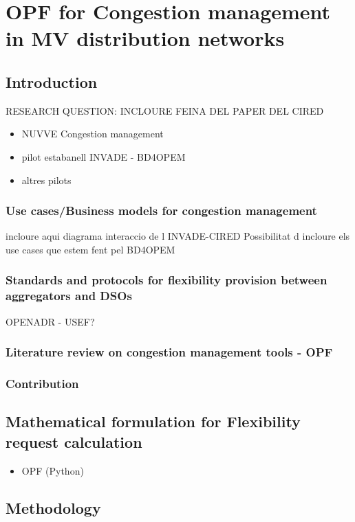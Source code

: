 \chapter{OPF for Congestion management in MV distribution networks}
\label{ChapterOPFDSO}

\section{Introduction}
RESEARCH QUESTION: INCLOURE FEINA DEL PAPER DEL CIRED
\begin{itemize}
\item NUVVE Congestion management
\item pilot estabanell INVADE - BD4OPEM 
\item altres pilots
\end{itemize}

\subsection{Use cases/Business models for congestion management}
incloure aqui diagrama interaccio de l INVADE-CIRED
Possibilitat d incloure els use cases que estem fent pel BD4OPEM 

\subsection{Standards and protocols for flexibility provision between aggregators and DSOs}
OPENADR - USEF? 
\subsection{Literature review on congestion management tools - OPF}
\subsection{Contribution}


\section{Mathematical formulation for Flexibility request calculation}
\begin{itemize}
	\item OPF (Python)
\end{itemize}

\section{Methodology}
